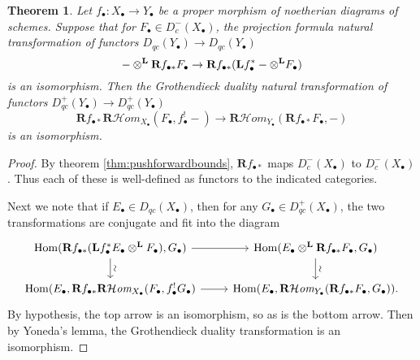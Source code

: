 \documentclass[proquest]{uwthesis}[2014/11/13]
\newtheorem{theorem}{Theorem}[section]
\theoremstyle{definition}
\DeclareMathOperator{\Hom}{Hom}
\newcommand{\cHom}{\mathcal{H} \textit{om}}
\newcommand{\bL}{\textbf{L}}
\newcommand{\bR}{\textbf{R}}
\newcommand{\otimesL}{\otimes^{\bf L}}
\begin{document}
\begin{theorem}
	Let $f_\bullet : X_\bullet \rightarrow Y_\bullet$ be a proper morphism of noetherian diagrams of schemes.
	Suppose that for $F_\bullet \in D_{c}^-(X_\bullet)$, the projection formula natural transformation of functors $D_{qc}(Y_\bullet) \rightarrow D_{qc}(Y_\bullet)$
	\[
		- \otimesL \bR f_{\bullet *} F_\bullet \rightarrow \bR f_{\bullet *}(\bL f_\bullet^* - \otimesL F_\bullet)
	\]
	is an isomorphism.
	Then the Grothendieck duality natural transformation of functors $D_{qc}^+(Y_\bullet) \rightarrow D_{qc}^+(Y_\bullet)$
	\[
		\bR f_{\bullet *} \bR \cHom_{X_\bullet} (F_\bullet, f_\bullet^! -) \rightarrow \bR \cHom_{Y_\bullet} (\bR f_{\bullet *} F_\bullet, -)
	\]
	is an isomorphism.
\end{theorem}
\begin{proof}
	By theorem \ref{thm:pushforwardbounds}, $\bR f_{\bullet *}$ maps $D^-_{c}(X_\bullet)$ to $D_c^-(X_\bullet)$.
	Thus each of these is well-defined as functors to the indicated categories.
	
	Next we note that if $E_\bullet \in D_{qc}(X_\bullet)$, then for any $G_\bullet \in D_{qc}^+(X_\bullet)$, the two transformations are conjugate and fit into the diagram
	\[
	\begin{tikzcd}
		\Hom(\bR f_{\bullet *}(\bL f_\bullet^* E_\bullet \otimesL F_\bullet), G_\bullet) \arrow{d}[sloped, above]{\sim} \arrow{r} & \Hom(E_\bullet \otimesL \bR f_{\bullet *} F_\bullet, G_\bullet) \arrow{d}[sloped, above]{\sim} \\
		\Hom(E_\bullet, \bR f_{\bullet *} \bR \cHom_{X_\bullet} (F_\bullet, f_\bullet^! G_\bullet) \arrow{r} & \Hom(E_\bullet, \bR \cHom_{Y_\bullet} (\bR f_{\bullet *} F_\bullet, G_\bullet)).
	\end{tikzcd}
	\]
	By hypothesis, the top arrow is an isomorphism, so as is the bottom arrow.
	Then by Yoneda's lemma, the Grothendieck duality transformation is an isomorphism.
\end{proof}
\end{document}
